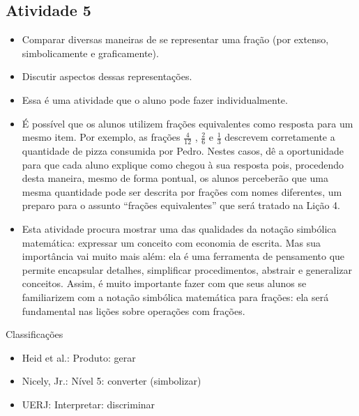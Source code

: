 \begin{multicols}{2}
\subsection{Atividade 5}

   \vspace{.1cm}

  \begin{itemize} %
    \item       Comparar diversas maneiras de se representar uma fração (por extenso, simbolicamente e graficamente).
    \item       Discutir aspectos dessas representações.
\end{itemize} %


  \vspace{.1cm} 
  
  \vspace{.1cm}

  \begin{itemize} %
    \item       Essa é uma atividade que o aluno pode fazer individualmente.
    \item       É possível que os alunos utilizem frações equivalentes como resposta para um mesmo item. Por exemplo, as frações       $\frac{4}{12}$      ,       $\frac{2}{6}$       e       $\frac{1}{3}$        descrevem corretamente a quantidade de pizza consumida por Pedro. Nestes casos, dê a oportunidade para que cada aluno explique como chegou à sua resposta pois, procedendo desta maneira, mesmo de forma pontual, os alunos perceberão que uma mesma quantidade pode ser descrita por frações com nomes diferentes, um preparo para o assunto       ``frações equivalentes''       que será tratado na Lição 4.
    \item       Esta atividade procura mostrar uma das qualidades da notação simbólica matemática: expressar um conceito com economia de escrita. Mas sua importância vai muito mais além: ela é uma ferramenta de pensamento que permite encapsular detalhes, simplificar procedimentos, abstrair e generalizar conceitos. Assim, é muito importante fazer com que seus alunos se familiarizem com a notação simbólica matemática para frações: ela será fundamental nas lições sobre operações com frações.
\end{itemize} %


  Classificações
\begin{itemize} %
    \item       Heid et al.: Produto: gerar
    \item       Nicely, Jr.: Nível 5: converter (simbolizar)
    \item       UERJ: Interpretar: discriminar
\end{itemize} %





\end{multicols}
